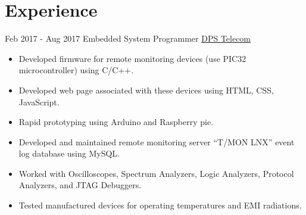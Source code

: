 \documentclass[letterpaper]{twentysecondcv} %
\begin{document}
\makeprofile %
 

\section{Experience}

\begin{twenty} %
\twentyitem
    	{Feb 2017 -}
		{Aug 2017}
        {Embedded System Programmer}
        {\href{https://www.dpstele.com/}{DPS Telecom}}
        {}
        {\begin{itemize}
        \item Developed firmware for remote monitoring devices (use PIC32 microcontroller) using C/C++.
        \item Developed web page associated with these devices using HTML, CSS, JavaScript.
        \item Rapid prototyping using Arduino and Raspberry pie.
        \item Developed and maintained remote monitoring server “T/MON LNX” event log database using MySQL.
        \item Worked with Oscilloscopes, Spectrum Analyzers, Logic Analyzers, Protocol Analyzers, and JTAG Debuggers.
        \item Tested manufactured devices for operating temperatures and EMI radiations.
        \end{itemize}}
        
\end{twenty}

\end{document}
